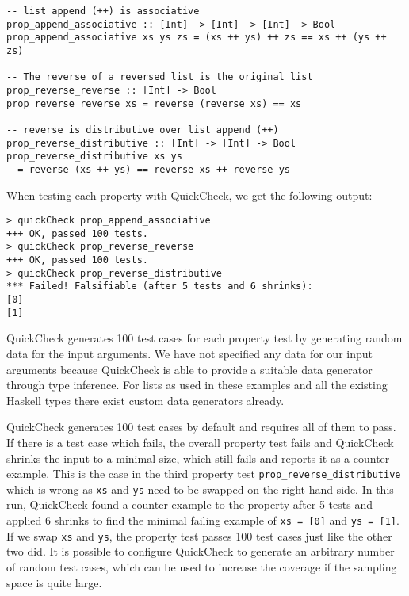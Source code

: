\begin{footnotesize}
\begin{verbatim}
-- list append (++) is associative
prop_append_associative :: [Int] -> [Int] -> [Int] -> Bool
prop_append_associative xs ys zs = (xs ++ ys) ++ zs == xs ++ (ys ++ zs)

-- The reverse of a reversed list is the original list
prop_reverse_reverse :: [Int] -> Bool
prop_reverse_reverse xs = reverse (reverse xs) == xs

-- reverse is distributive over list append (++)
prop_reverse_distributive :: [Int] -> [Int] -> Bool
prop_reverse_distributive xs ys 
  = reverse (xs ++ ys) == reverse xs ++ reverse ys
\end{verbatim}
\end{footnotesize}

When testing each property with QuickCheck, we get the following output:

\begin{footnotesize}
\begin{verbatim}
> quickCheck prop_append_associative
+++ OK, passed 100 tests.
> quickCheck prop_reverse_reverse
+++ OK, passed 100 tests.
> quickCheck prop_reverse_distributive
*** Failed! Falsifiable (after 5 tests and 6 shrinks):    
[0]
[1]
\end{verbatim}
\end{footnotesize}

QuickCheck generates 100 test cases for each property test by generating random data for the input arguments. We have not specified any data for our input arguments because QuickCheck is able to provide a suitable data generator through type inference. For lists as used in these examples and all the existing Haskell types there exist custom data generators already. %

QuickCheck generates 100 test cases by default and requires all of them to pass. If there is a test case which fails, the overall property test fails and QuickCheck shrinks the input to a minimal size, which still fails and reports it as a counter example. This is the case in the third property test \texttt{prop\_reverse\_distributive} which is wrong as \texttt{xs} and \texttt{ys} need to be swapped on the right-hand side. In this run, QuickCheck found a counter example to the property after 5 tests and applied 6 shrinks to find the minimal failing example of \texttt{xs = [0]} and \texttt{ys = [1]}. If we swap \texttt{xs} and \texttt{ys}, the property test passes 100 test cases just like the other two did. It is possible to configure QuickCheck to generate an arbitrary number of random test cases, which can be used to increase the coverage if the sampling space is quite large.

